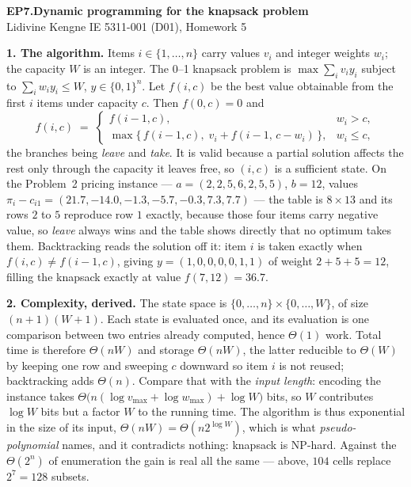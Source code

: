 \documentclass[10pt]{article}
\begin{document}
{\large\bfseries EP7.\quad Dynamic programming for the knapsack problem}\\[1pt]
{\small Lidivine Kengne \quad\textbar\quad IE 5311-001 (D01), Homework 5}
\vspace{0.3em}

\textbf{1. The algorithm.}
Items $i \in \{1,\dots,n\}$ carry values $v_i$ and integer weights
$w_i$; the capacity $W$ is an integer. The 0--1 knapsack problem is
$\max \sum_i v_i y_i$ subject to $\sum_i w_i y_i \le W$,
$y \in \{0,1\}^n$. Let $f(i,c)$ be the best value obtainable from the
first $i$ items under capacity $c$. Then $f(0,c) = 0$ and
\[
  f(i,c) \;=\;
  \begin{cases}
    f(i-1,c), & w_i > c,\\[2pt]
    \max\bigl\{\, f(i-1,c),\; v_i + f(i-1,\,c-w_i) \,\bigr\}, & w_i \le c,
  \end{cases}
\]
the branches being \emph{leave} and \emph{take}. It is valid because a
partial solution affects the rest only through the capacity it leaves
free, so $(i,c)$ is a sufficient state. On the Problem~2 pricing
instance --- $a = (2,2,5,6,2,5,5)$, $b = 12$, values
$\pi_i - c_{i1} = (21.7,-14.0,-1.3,-5.7,-0.3,7.3,7.7)$ --- the table is
$8 \times 13$ and its rows $2$ to $5$ reproduce row $1$ exactly,
because those four items carry negative value, so \emph{leave} always
wins and the table shows directly that no optimum takes them.
Backtracking reads the solution off it: item $i$ is taken exactly when
$f(i,c) \neq f(i-1,c)$, giving $y = (1,0,0,0,0,1,1)$ of weight
$2+5+5 = 12$, filling the knapsack exactly at value
$f(7,12) = 36.7$.

\textbf{2. Complexity, derived.}
The state space is $\{0,\dots,n\} \times \{0,\dots,W\}$, of size
$(n+1)(W+1)$. Each state is evaluated once, and its evaluation is one
comparison between two entries already computed, hence $\Theta(1)$
work. Total time is therefore $\Theta(nW)$ and storage $\Theta(nW)$,
the latter reducible to $\Theta(W)$ by keeping one row and sweeping $c$
downward so item $i$ is not reused; backtracking adds $\Theta(n)$.
Compare that with the \emph{input length}: encoding the instance takes
$\Theta\bigl(n(\log v_{\max} + \log w_{\max}) + \log W\bigr)$ bits, so
$W$ contributes $\log W$ bits but a factor $W$ to the running time.
The algorithm is thus exponential in the size of its input,
$\Theta(nW) = \Theta(n2^{\log W})$, which is what
\emph{pseudo-polynomial} names, and it contradicts nothing: knapsack
is NP-hard. Against the $\Theta(2^n)$ of enumeration the gain is real
all the same --- above, $104$ cells replace $2^7 = 128$ subsets.
\end{document}
